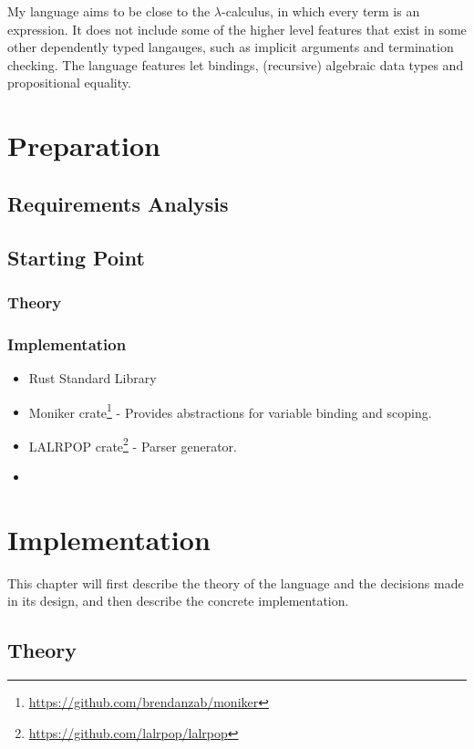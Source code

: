 \documentclass[12pt,a4paper,twoside]{report}
\begin{document}
My language aims to be close to the \(\lambda\)-calculus, in which every term is an expression. It does not include some of the higher level features that exist in some other dependently typed langauges, such as implicit arguments and termination checking. The language features let bindings, (recursive) algebraic data types and propositional equality.


\chapter{Preparation}

\section{Requirements Analysis}



\section{Starting Point}
\subsection{Theory}

\subsection{Implementation}
\begin{itemize}
    \item Rust Standard Library
    \item Moniker crate\footnote{\url{https://github.com/brendanzab/moniker}} - Provides abstractions for variable binding and scoping.
    \item LALRPOP crate\footnote{\url{https://github.com/lalrpop/lalrpop}} - Parser generator.
    \item {}
\end{itemize}

\chapter{Implementation}

This chapter will first describe the theory of the language and the decisions made in its design, and then describe the concrete implementation.

\section{Theory}
\end{document}
